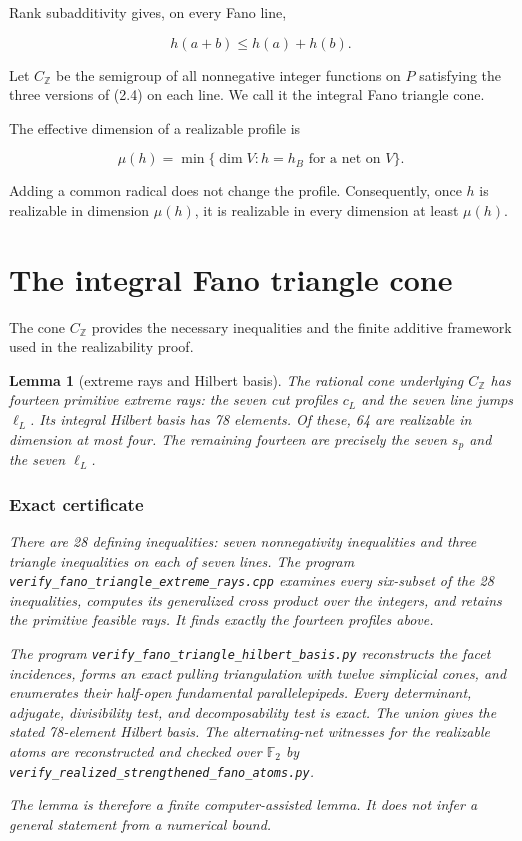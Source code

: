 \documentclass[11pt]{article}
\newtheorem{lemma}[theorem]{Lemma}
\theoremstyle{remark}
\numberwithin{equation}{section}
\begin{document}
Rank subadditivity gives, on every Fano line,

\nopagebreak[4]
\[
h(a+b)\le h(a)+h(b).
\tag{2.4}
\]

Let $C_{\mathbb Z}$ be the semigroup of all nonnegative integer functions on
$P$ satisfying the three versions of (2.4) on each line. We call it the
integral Fano triangle cone.

The effective dimension of a realizable profile is

\nopagebreak[4]
\[
\mu(h)=\min\{\dim V:h=h_B\text{ for a net on }V\}.
\tag{2.5}
\]

Adding a common radical does not change the profile. Consequently, once $h$ is
realizable in dimension $\mu(h)$, it is realizable in every dimension at least
$\mu(h)$.

\section{The integral Fano triangle cone}


The cone $C_{\mathbb Z}$ provides the necessary inequalities and the finite
additive framework used in the realizability proof.

\Needspace{0.28\textheight}
\begin{lemma}[extreme rays and Hilbert basis]

The rational cone underlying $C_{\mathbb Z}$ has fourteen primitive extreme
rays: the seven cut profiles $c_L$ and the seven line jumps $\ell_L$.
Its integral Hilbert basis has 78 elements. Of these, 64 are realizable in
dimension at most four. The remaining fourteen are precisely the seven
$s_p$ and the seven $\ell_L$.

\subsubsection*{Exact certificate}


There are 28 defining inequalities: seven nonnegativity inequalities and three
triangle inequalities on each of seven lines. The program
\nolinkurl{verify_fano_triangle_extreme_rays.cpp} examines every six-subset of the 28
inequalities, computes its generalized cross product over the integers, and
retains the primitive feasible rays. It finds exactly the fourteen profiles
above.

The program \nolinkurl{verify_fano_triangle_hilbert_basis.py} reconstructs the facet
incidences, forms an exact pulling triangulation with twelve simplicial cones,
and enumerates their half-open fundamental parallelepipeds. Every determinant,
adjugate, divisibility test, and decomposability test is exact. The union gives
the stated 78-element Hilbert basis. The alternating-net witnesses for the
realizable atoms are reconstructed and checked over $\mathbb F_2$ by
\nolinkurl{verify_realized_strengthened_fano_atoms.py}.

The lemma is therefore a finite computer-assisted lemma. It does not infer a
general statement from a numerical bound.

\end{lemma}
\end{document}
